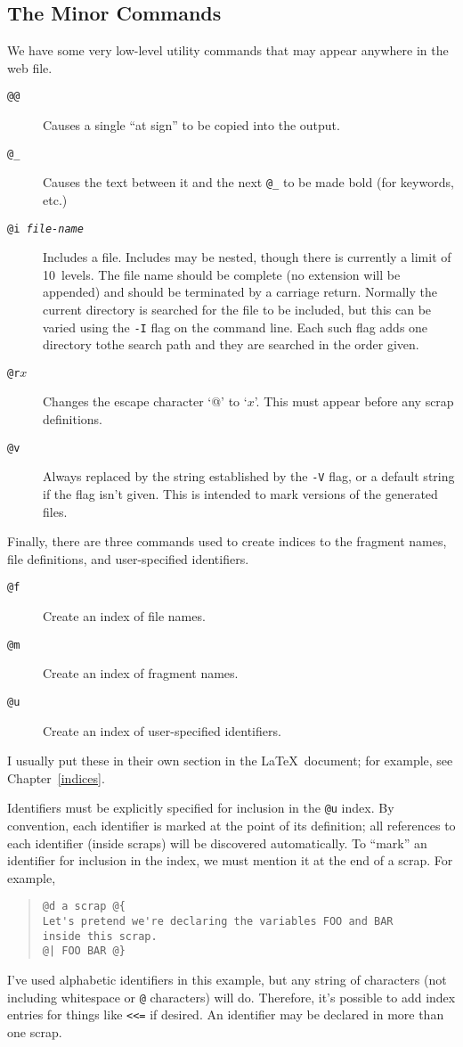 \documentclass[a4paper]{report}
\begin{document}
\subsection{The Minor Commands\label{minorcommands}}

We have some very low-level utility commands that may appear anywhere
in the web file.
\begin{description}
\item[\tt @@] Causes a single ``at sign'' to be copied into the output.
\item[\tt @\_] Causes the text between it and the next {\tt @\_}
      to be made bold (for keywords, etc.)
\item[\tt @i {\em file-name\/}] Includes a file. Includes may be
  nested, though there is currently a limit of 10~levels. The file name
  should be complete (no extension will be appended) and should be
  terminated by a carriage return. Normally the current directory is
  searched for the file to be included, but this can be varied using
  the \verb|-I| flag on the command line. Each such flag adds one
  directory tothe search path and they are searched in the order
  given.
\item[{\tt @r}$x$] Changes the escape character `@' to `$x$'.
  This must appear before any scrap definitions.
\item[\tt @v] Always replaced by the string established by
the \texttt{-V} flag, or a default string if the flag isn't
given. This is intended to mark versions of the generated
files.
\end{description}
Finally, there are three commands used to create indices to the
fragment
names, file definitions, and user-specified identifiers.
\begin{description}
\item[\tt @f] Create an index of file names.
\item[\tt @m] Create an index of fragment names.
\item[\tt @u] Create an index of user-specified identifiers.
\end{description}
I usually put these in their own section
in the \LaTeX\ document; for example, see Chapter~\ref{indices}.

Identifiers must be explicitly specified for inclusion in the
\verb|@u| index. By convention, each identifier is marked at the
point of its definition; all references to each identifier (inside
scraps) will be discovered automatically. To ``mark'' an identifier
for inclusion in the index, we must mention it at the end of a scrap.
For example,
\begin{quote}
\begin{verbatim}
@d a scrap @{
Let's pretend we're declaring the variables FOO and BAR
inside this scrap.
@| FOO BAR @}
\end{verbatim}
\end{quote}
I've used alphabetic identifiers in this example, but any string of
characters (not including whitespace or \verb|@| characters) will do.
Therefore, it's possible to add index entries for things like
\verb|<<=| if desired. An identifier may be declared in more than one
scrap.
\end{document}
